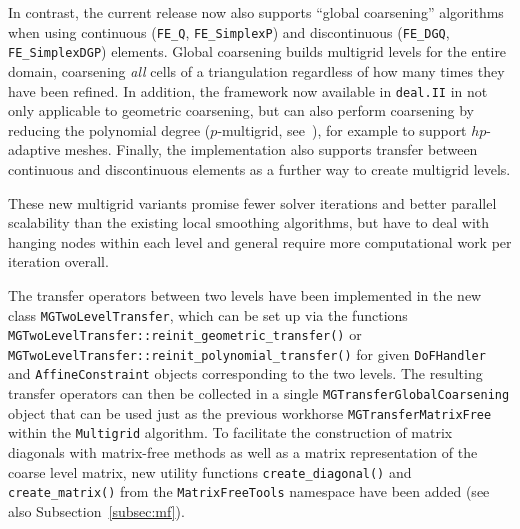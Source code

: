 \documentclass{ansarticle-preprint}
\newcommand{\specialword}[1]{\texttt{#1}}
\newcommand{\dealii}{{\specialword{deal.II}}\xspace}
\begin{document}
In contrast, the current release now also supports ``global
coarsening'' algorithms \citep{becker2000multigrid, sundar2012parallel} when
using continuous (\texttt{FE\_Q}, \texttt{FE\_SimplexP}) and
discontinuous (\texttt{FE\_DGQ}, \texttt{FE\_SimplexDGP})
elements. Global coarsening builds multigrid levels for the entire
domain, coarsening \textit{all} cells of a triangulation regardless of
how many times they have been refined. In addition, the framework now available in
\dealii{} in not only applicable to geometric coarsening, but can also
perform coarsening by reducing the polynomial degree ($p$-multigrid,
see~\cite{Fehn2020}), for example
to support $hp$-adaptive meshes.
Finally, the implementation also supports transfer between continuous
and discontinuous elements as a further way to create multigrid levels.

These new multigrid variants promise fewer solver
iterations and better parallel scalability than the existing local
smoothing algorithms, but have to deal with
hanging nodes within each level and general require more computational
work per iteration overall.

The transfer operators between two levels have been implemented in the new class \texttt{MGTwoLevel\allowbreak Transfer}, which can be set up via the functions \texttt{MGTwoLevel\allowbreak Transfer::\allowbreak reinit\_\allowbreak geometric\_\allowbreak transfer()} or \texttt{MGTwo\allowbreak LevelTransfer::\allowbreak reinit\_\allowbreak polynomial\_\allowbreak transfer()} for given
\texttt{DoFHandler} and \texttt{AffineConstraint} objects
corresponding to the two levels. The resulting transfer operators
can then be collected in a single
\texttt{MGTransfer\allowbreak GlobalCoarsening} object that can be used just as the previous workhorse \texttt{MGTransferMatrixFree} within the \texttt{Multigrid}
algorithm.
To facilitate the construction of matrix diagonals with matrix-free methods as well as a matrix representation of the coarse level matrix, new utility functions \texttt{create\_diagonal()} and \texttt{create\_matrix()} from
the \texttt{MatrixFreeTools} namespace have been added (see also Subsection~\ref{subsec:mf}).
\end{document}
